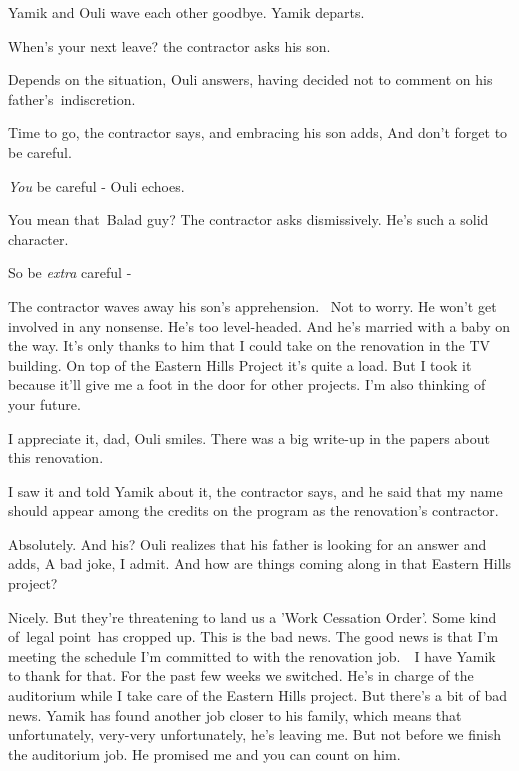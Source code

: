 \documentclass[twoside,11pt]{book}
\begin{document}
Yamik and Ouli wave each other goodbye. Yamik departs.

{\textquotedbl}When's your next leave?{\textquotedbl} the contractor asks his son. 

{\textquotedbl}Depends on the situation,{\textquotedbl} Ouli answers, having decided not to comment on his
father{}'s\ indiscretion.

{\textquotedbl}Time to go,{\textquotedbl} the contractor says, and embracing his son adds, {\textquotedbl}And don't
forget to be careful.{\textquotedbl}\ 

{\textquotedbl}\textit{You} be careful -{\textquotedbl} Ouli echoes. 

{\textquotedbl}You mean that\ Balad guy?{\textquotedbl} The contractor asks dismissively. {\textquotedbl}He's such a
solid character.{\textquotedbl} 

{\textquotedbl}So be \textit{extra} careful -{\textquotedbl} 

The contractor waves away his son's apprehension.~ {\textquotedbl}Not to worry. He won't get involved in any nonsense.
He's too level-headed. And he's married with a baby on the way. It's only thanks to him that I could take on the
renovation in the TV building. On top of the Eastern Hills Project it's quite a load. But I took it because it'll give
me a foot in the door for other projects. I'm also thinking of your future.{\textquotedbl} 

{\textquotedbl}I appreciate it, dad,{\textquotedbl} Ouli smiles. {\textquotedbl}There was a big write-up in the papers
about this renovation.{\textquotedbl} 

{\textquotedbl}I saw it and told Yamik about it,{\textquotedbl} the contractor says, {\textquotedbl}and he said that my
name should appear among the credits on the program as the renovation's contractor.{\textquotedbl} \ 

{\textquotedbl}Absolutely. And his?{\textquotedbl} Ouli realizes that his father is looking for an answer and adds,
{\textquotedbl}A bad joke, I admit. And how are things coming along in that Eastern Hills project?{\textquotedbl} 

{\textquotedbl}Nicely. But they're threatening to land us a 'Work Cessation Order'. Some kind of~legal point~has cropped
up. This is the bad news. The good news is that I'm meeting the schedule I'm committed to with the renovation job.\ \ I
have Yamik to thank for that. For the past few weeks we switched. He's in charge of the auditorium while I take care of
the Eastern Hills project. But there's a bit of bad news. Yamik has found another job closer to his family, which means
that unfortunately, very{}-very unfortunately, he's leaving me. But not before we finish the auditorium job. He
promised me and you can count on him.{\textquotedbl}
\end{document}
